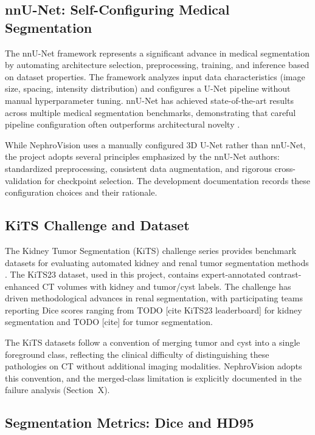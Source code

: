 \subsection{nnU-Net: Self-Configuring Medical Segmentation}

The nnU-Net framework \cite{nnunet} represents a significant advance in medical segmentation by automating architecture selection, preprocessing, training, and inference based on dataset properties. The framework analyzes input data characteristics (image size, spacing, intensity distribution) and configures a U-Net pipeline without manual hyperparameter tuning. nnU-Net has achieved state-of-the-art results across multiple medical segmentation benchmarks, demonstrating that careful pipeline configuration often outperforms architectural novelty \cite{nnunet_benchmarks}.

While NephroVision uses a manually configured 3D U-Net rather than nnU-Net, the project adopts several principles emphasized by the nnU-Net authors: standardized preprocessing, consistent data augmentation, and rigorous cross-validation for checkpoint selection. The development documentation records these configuration choices and their rationale.

\subsection{KiTS Challenge and Dataset}

The Kidney Tumor Segmentation (KiTS) challenge series provides benchmark datasets for evaluating automated kidney and renal tumor segmentation methods \cite{kits23}. The KiTS23 dataset, used in this project, contains expert-annotated contrast-enhanced CT volumes with kidney and tumor/cyst labels. The challenge has driven methodological advances in renal segmentation, with participating teams reporting Dice scores ranging from TODO [cite KiTS23 leaderboard] for kidney segmentation and TODO [cite] for tumor segmentation.

The KiTS datasets follow a convention of merging tumor and cyst into a single foreground class, reflecting the clinical difficulty of distinguishing these pathologies on CT without additional imaging modalities. NephroVision adopts this convention, and the merged-class limitation is explicitly documented in the failure analysis (Section~X).

\subsection{Segmentation Metrics: Dice and HD95}


